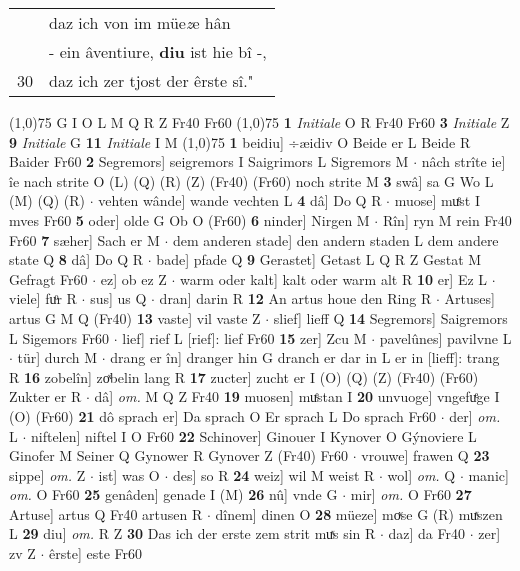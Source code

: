 \documentclass[8pt,a4paper,notitlepage]{article}
\begin{document}
\begin{table}[ht]
\begin{minipage}[t]{0.5\linewidth}
\begin{tabular}{rl}
 & daz ich von im müe\textit{z}e hân\\ 
 & - ein âventiure, \textbf{diu} ist hie bî -,\\ 
30 & daz ich zer tjost der êrste sî."\\ 
\end{tabular}
\scriptsize
\line(1,0){75} \newline
G I O L M Q R Z Fr40 Fr60 \newline
\line(1,0){75} \newline
\textbf{1} \textit{Initiale} O R Fr40 Fr60  \textbf{3} \textit{Initiale} Z  \textbf{9} \textit{Initiale} G  \textbf{11} \textit{Initiale} I M  \newline
\line(1,0){75} \newline
\textbf{1} beidiu] ÷æidiv O Beide er L Beide R Baider Fr60 \textbf{2} Segremors] seigremors I Saigrimors L Sigremors M  $\cdot$ nâch strîte ie] îe nach strite O (L) (Q) (R) (Z) (Fr40) (Fr60) noch strite M \textbf{3} swâ] sa G Wo L (M) (Q) (R)  $\cdot$ vehten wânde] wande vechten L \textbf{4} dâ] Do Q R  $\cdot$ muose] muͤst I mves Fr60 \textbf{5} oder] olde G Ob O (Fr60) \textbf{6} ninder] Nirgen M  $\cdot$ Rîn] ryn M rein Fr40 Fr60 \textbf{7} sæher] Sach er M  $\cdot$ dem anderen stade] den andern staden L dem andere state Q \textbf{8} dâ] Do Q R  $\cdot$ bade] pfade Q \textbf{9} Gerastet] Getast L Q R Z Gestat M Gefragt Fr60  $\cdot$ ez] ob ez Z  $\cdot$ warm oder kalt] kalt oder warm alt R \textbf{10} er] Ez L  $\cdot$ viele] fuͦr R  $\cdot$ sus] us Q  $\cdot$ dran] darin R \textbf{12} An artus houe den Ring R  $\cdot$ Artuses] artus G M Q (Fr40) \textbf{13} vaste] vil vaste Z  $\cdot$ slief] lieff Q \textbf{14} Segremors] Saigremors L Sigemors Fr60  $\cdot$ lief] rief L [rief]: lief Fr60 \textbf{15} zer] Zcu M  $\cdot$ pavelûnes] pavilvne L  $\cdot$ tür] durch M  $\cdot$ drang er în] dranger hin G dranch er dar in L er in [lieff]: trang R \textbf{16} zobelîn] zoͯbelin lang R \textbf{17} zucter] zucht er I (O) (Q) (Z) (Fr40) (Fr60) Zukter er R  $\cdot$ dâ] \textit{om.} M Q Z Fr40 \textbf{19} muosen] muͤstan I \textbf{20} unvuoge] vngefuͤge I (O) (Fr60) \textbf{21} dô sprach er] Da sprach O Er sprach L Do sprach Fr60  $\cdot$ der] \textit{om.} L  $\cdot$ niftelen] niftel I O Fr60 \textbf{22} Schinover] Ginouer I Kynover O Gýnoviere L Ginofer M Seiner Q Gynower R Gynover Z (Fr40) Fr60  $\cdot$ vrouwe] frawen Q \textbf{23} sippe] \textit{om.} Z  $\cdot$ ist] was O  $\cdot$ des] so R \textbf{24} weiz] wil M weist R  $\cdot$ wol] \textit{om.} Q  $\cdot$ manic] \textit{om.} O Fr60 \textbf{25} genâden] genade I (M) \textbf{26} nû] vnde G  $\cdot$ mir] \textit{om.} O Fr60 \textbf{27} Artuse] artus Q Fr40 artusen R  $\cdot$ dînem] dinen O \textbf{28} müeze] moͮse G (R) muͯszen L \textbf{29} diu] \textit{om.} R Z \textbf{30} Das ich der erste zem strit muͯs sin R  $\cdot$ daz] da Fr40  $\cdot$ zer] zv Z  $\cdot$ êrste] este Fr60 \newline

\end{minipage}
\end{table}
\end{document}
